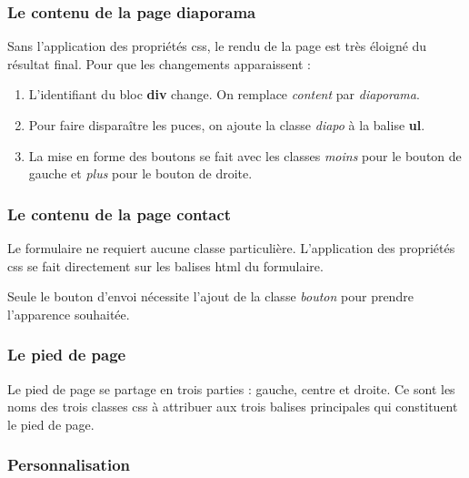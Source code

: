 \hypertarget{le-contenu-de-la-page-diaporama}{%
\subsubsection{Le contenu de la page
diaporama}\label{le-contenu-de-la-page-diaporama}}

Sans l'application des propriétés css, le rendu de la page est très
éloigné du résultat final. Pour que les changements apparaissent :

\begin{enumerate}
\tightlist
\item
  L'identifiant du bloc \textbf{div} change. On remplace \emph{content}
  par \emph{diaporama}.
\item
  Pour faire disparaître les puces, on ajoute la classe \emph{diapo} à
  la balise \textbf{ul}.
\item
  La mise en forme des boutons se fait avec les classes \emph{moins}
  pour le bouton de gauche et \emph{plus} pour le bouton de droite.
\end{enumerate}

\hypertarget{le-contenu-de-la-page-contact}{%
\subsubsection{Le contenu de la page
contact}\label{le-contenu-de-la-page-contact}}

Le formulaire ne requiert aucune classe particulière. L'application des
propriétés css se fait directement sur les balises html du formulaire.

Seule le bouton d'envoi nécessite l'ajout de la classe \emph{bouton}
pour prendre l'apparence souhaitée.

\hypertarget{le-pied-de-page}{%
\subsubsection{Le pied de page}\label{le-pied-de-page}}

Le pied de page se partage en trois parties : gauche, centre et droite.
Ce sont les noms des trois classes css à attribuer aux trois balises
principales qui constituent le pied de page.

\hypertarget{personnalisation}{%
\subsubsection{Personnalisation}\label{personnalisation}}

